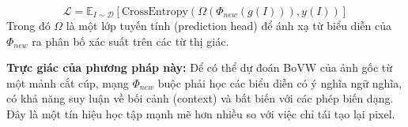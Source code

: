 \begin{enumerate}
\begin{itemize}
\begin{enumerate}
                \begin{equation}
                    \mathcal{L} = \mathbb{E}_{I \sim \mathcal{D}} \left[ \text{CrossEntropy}(\Omega(\Phi_{new}(g(I))), y(I)) \right]
                    \label{eq:bovw_ssl_loss}
                \end{equation}
                Trong đó $\Omega$ là một lớp tuyến tính (prediction head) để ánh xạ từ biểu diễn của $\Phi_{new}$ ra phân bố xác suất trên các từ thị giác.
            \end{enumerate}
    \end{itemize}
    \textbf{Trực giác của phương pháp này:} Để có thể dự đoán BoVW của ảnh gốc từ một mảnh cắt cúp, mạng $\Phi_{new}$ buộc phải học các biểu diễn có ý nghĩa ngữ nghĩa, có khả năng suy luận về bối cảnh (context) và bất biến với các phép biến dạng. Đây là một tín hiệu học tập mạnh mẽ hơn nhiều so với việc chỉ tái tạo lại pixel.
\end{enumerate}

